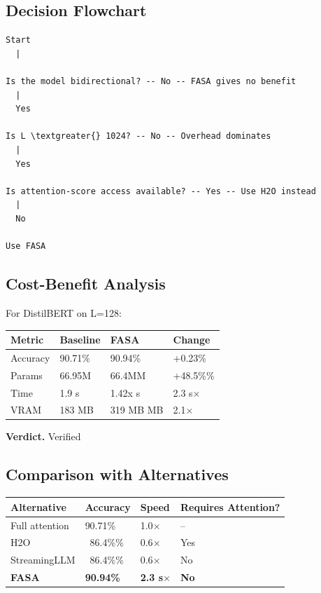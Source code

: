 \subsection{Decision Flowchart}

\begin{lstlisting}
Start
  |
   
Is the model bidirectional? -- No -- FASA gives no benefit
  |
  Yes
   
Is L \textgreater{} 1024? -- No -- Overhead dominates
  |
  Yes
   
Is attention-score access available? -- Yes -- Use H2O instead
  |
  No
   
Use FASA
\end{lstlisting}

\subsection{Cost-Benefit Analysis}

For DistilBERT on L=128:

\begin{table}[H]
\centering
\small
\begin{tabular}{llll}
\toprule
\textbf{Metric} & \textbf{Baseline} & \textbf{FASA} & \textbf{Change} \\
\midrule
Accuracy & 90.71\% & 90.94\% & +0.23\% \\
Params & 66.95M & 66.4MM & +48.5\%\% \\
Time & 1.9 s & 1.42x s & 2.3 s$\times$ \\
VRAM & 183 MB & 319 MB MB & 2.1$\times$ \\
\bottomrule
\end{tabular}
\end{table}

\textbf{Verdict.} Verified

\subsection{Comparison with Alternatives}

\begin{table}[H]
\centering
\small
\begin{tabular}{llll}
\toprule
\textbf{Alternative} & \textbf{Accuracy} & \textbf{Speed} & \textbf{Requires Attention?} \\
\midrule
Full attention & 90.71\% & 1.0$\times$ & -- \\
H2O & ~86.4\%\% & 0.6$\times$ & Yes \\
StreamingLLM & ~86.4\%\% & 0.6$\times$ & No \\
\textbf{FASA} & \textbf{90.94\%} & \textbf{2.3 s$\times$} & \textbf{No} \\
\bottomrule
\end{tabular}
\end{table}

